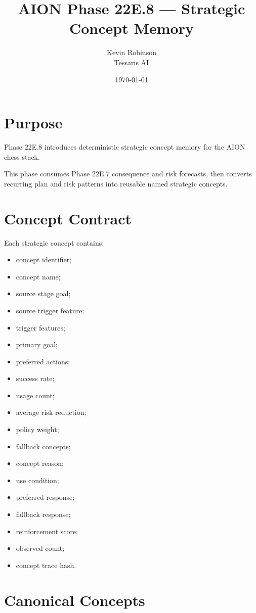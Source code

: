 \documentclass[11pt,a4paper]{article}
\title{\textbf{AION Phase 22E.8 --- Strategic Concept Memory}}
\author{Kevin Robinson\\Tessaris AI}
\date{\today}
\begin{document}
\maketitle

\section{Purpose}

Phase 22E.8 introduces deterministic strategic concept memory for the AION chess stack.

This phase consumes Phase 22E.7 consequence and risk forecasts, then converts recurring plan and risk patterns into reusable named strategic concepts.

\section{Concept Contract}

Each strategic concept contains:

\begin{itemize}[leftmargin=*]
  \item concept identifier;
  \item concept name;
  \item source stage goal;
  \item source trigger feature;
  \item trigger features;
  \item primary goal;
  \item preferred actions;
  \item success rate;
  \item usage count;
  \item average risk reduction;
  \item policy weight;
  \item fallback concepts;
  \item concept reason;
  \item use condition;
  \item preferred response;
  \item fallback response;
  \item reinforcement score;
  \item observed count;
  \item concept trace hash.
\end{itemize}

\section{Canonical Concepts}
\end{document}
